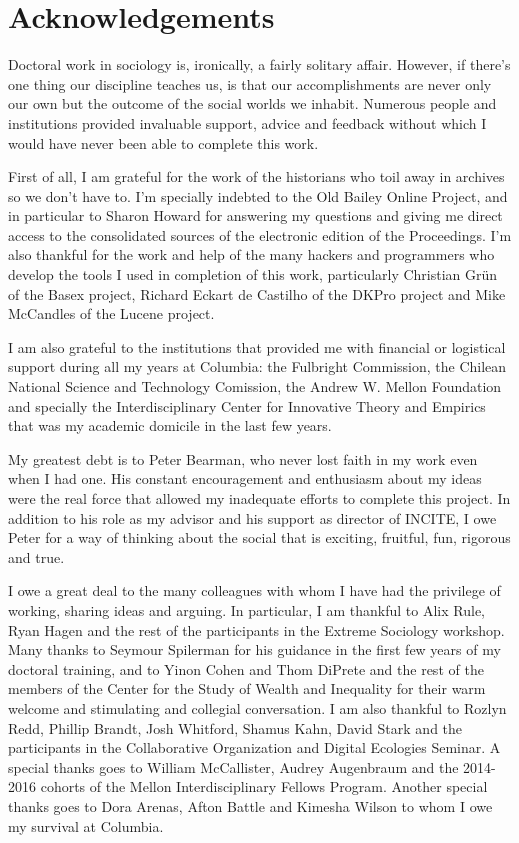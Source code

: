 \chapter*{Acknowledgements}

Doctoral work in sociology is, ironically, a fairly solitary affair.
However, if there’s one thing our discipline teaches us, is that our accomplishments are never only our own but the outcome of the social worlds we inhabit. Numerous people and institutions provided invaluable support, advice and feedback without which I would have never been able to complete this work.

First of all, I am grateful for the work of the historians who toil away in archives so we don’t have to. I’m specially indebted to the Old Bailey Online Project, and in particular to Sharon Howard for answering my questions and giving me direct access to the consolidated sources of the electronic edition of the Proceedings.
I’m also thankful for the work and help of the many hackers and programmers who develop the tools I used in completion of this work, particularly Christian Grün of the Basex project, Richard Eckart de Castilho of the DKPro project and Mike McCandles of the Lucene project.

I am also grateful to the institutions that provided me with financial or logistical support during all my years at Columbia: the Fulbright Commission, the Chilean National Science and Technology Comission, the Andrew W. Mellon Foundation and specially the Interdisciplinary Center for Innovative Theory and Empirics that was my academic domicile in the last few years.

My greatest debt is to Peter Bearman, who never lost faith in my work even when I had one.
His constant encouragement and enthusiasm about my ideas were the real force that allowed my inadequate efforts to complete this project.
In addition to his role as my advisor and his support as director of INCITE, I owe Peter for a way of thinking about the social that is exciting, fruitful, fun, rigorous and true.

I owe a great deal to the many colleagues with whom I have had the privilege of working, sharing ideas and arguing.
In particular, I am thankful to Alix Rule, Ryan Hagen and the rest of the participants in the Extreme Sociology workshop.
Many thanks to Seymour Spilerman for his guidance in the first few years of my doctoral training, and to Yinon Cohen and Thom DiPrete and the rest of the members of the Center for the Study of Wealth and Inequality for their warm welcome and stimulating and collegial conversation.
I am also thankful to Rozlyn Redd, Phillip Brandt, Josh Whitford, Shamus Kahn, David Stark and the participants in the Collaborative Organization and Digital Ecologies Seminar.
A special thanks goes to William McCallister, Audrey Augenbraum and the 2014-2016 cohorts of the Mellon Interdisciplinary Fellows Program. Another special thanks goes to Dora Arenas, Afton Battle and Kimesha Wilson to whom I owe my survival at Columbia.

